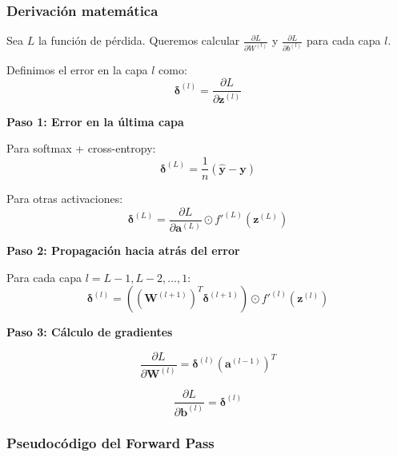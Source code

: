 \documentclass[a4paper,11pt]{article}
\begin{document}
\subsubsection{Derivación matemática}

Sea $L$ la función de pérdida. Queremos calcular $\frac{\partial L}{\partial W^{(l)}}$ y $\frac{\partial L}{\partial b^{(l)}}$ para cada capa $l$.

Definimos el error en la capa $l$ como:
\begin{equation}
\boldsymbol{\delta}^{(l)} = \frac{\partial L}{\partial \mathbf{z}^{(l)}}
\end{equation}

\textbf{Paso 1: Error en la última capa}

Para softmax + cross-entropy:
\begin{equation}
\boldsymbol{\delta}^{(L)} = \frac{1}{n}(\hat{\mathbf{y}} - \mathbf{y})
\end{equation}

Para otras activaciones:
\begin{equation}
\boldsymbol{\delta}^{(L)} = \frac{\partial L}{\partial \mathbf{a}^{(L)}} \odot f'^{(L)}(\mathbf{z}^{(L)})
\end{equation}

\textbf{Paso 2: Propagación hacia atrás del error}

Para cada capa $l = L-1, L-2, \ldots, 1$:
\begin{equation}
\boldsymbol{\delta}^{(l)} = \left((\mathbf{W}^{(l+1)})^T \boldsymbol{\delta}^{(l+1)}\right) \odot f'^{(l)}(\mathbf{z}^{(l)})
\end{equation}

\textbf{Paso 3: Cálculo de gradientes}

\begin{equation}
\frac{\partial L}{\partial \mathbf{W}^{(l)}} = \boldsymbol{\delta}^{(l)} (\mathbf{a}^{(l-1)})^T
\end{equation}

\begin{equation}
\frac{\partial L}{\partial \mathbf{b}^{(l)}} = \boldsymbol{\delta}^{(l)}
\end{equation}

\subsubsection{Pseudocódigo del Forward Pass}
\end{document}
